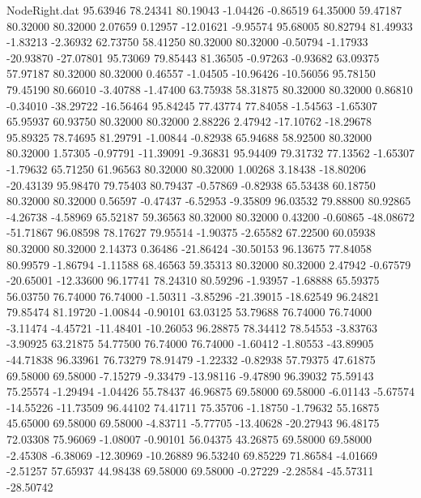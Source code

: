 \begin{filecontents}{NodeRight.dat}
  95.63946   78.24341   80.19043    -1.04426   -0.86519   64.35000   59.47187   80.32000   80.32000    2.07659    0.12957  -12.01621   -9.95574
  95.68005   80.82794   81.49933    -1.83213   -2.36932   62.73750   58.41250   80.32000   80.32000   -0.50794   -1.17933  -20.93870  -27.07801
  95.73069   79.85443   81.36505    -0.97263   -0.93682   63.09375   57.97187   80.32000   80.32000    0.46557   -1.04505  -10.96426  -10.56056
  95.78150   79.45190   80.66010    -3.40788   -1.47400   63.75938   58.31875   80.32000   80.32000    0.86810   -0.34010  -38.29722  -16.56464
  95.84245   77.43774   77.84058    -1.54563   -1.65307   65.95937   60.93750   80.32000   80.32000    2.88226    2.47942  -17.10762  -18.29678
  95.89325   78.74695   81.29791    -1.00844   -0.82938   65.94688   58.92500   80.32000   80.32000    1.57305   -0.97791  -11.39091   -9.36831
  95.94409   79.31732   77.13562    -1.65307   -1.79632   65.71250   61.96563   80.32000   80.32000    1.00268    3.18438  -18.80206  -20.43139
  95.98470   79.75403   80.79437    -0.57869   -0.82938   65.53438   60.18750   80.32000   80.32000    0.56597   -0.47437   -6.52953   -9.35809
  96.03532   79.88800   80.92865    -4.26738   -4.58969   65.52187   59.36563   80.32000   80.32000    0.43200   -0.60865  -48.08672  -51.71867
  96.08598   78.17627   79.95514    -1.90375   -2.65582   67.22500   60.05938   80.32000   80.32000    2.14373    0.36486  -21.86424  -30.50153
  96.13675   77.84058   80.99579    -1.86794   -1.11588   68.46563   59.35313   80.32000   80.32000    2.47942   -0.67579  -20.65001  -12.33600
  96.17741   78.24310   80.59296    -1.93957   -1.68888   65.59375   56.03750   76.74000   76.74000   -1.50311   -3.85296  -21.39015  -18.62549
  96.24821   79.85474   81.19720    -1.00844   -0.90101   63.03125   53.79688   76.74000   76.74000   -3.11474   -4.45721  -11.48401  -10.26053
  96.28875   78.34412   78.54553    -3.83763   -3.90925   63.21875   54.77500   76.74000   76.74000   -1.60412   -1.80553  -43.89905  -44.71838
  96.33961   76.73279   78.91479    -1.22332   -0.82938   57.79375   47.61875   69.58000   69.58000   -7.15279   -9.33479  -13.98116   -9.47890
  96.39032   75.59143   75.25574    -1.29494   -1.04426   55.78437   46.96875   69.58000   69.58000   -6.01143   -5.67574  -14.55226  -11.73509
  96.44102   74.41711   75.35706    -1.18750   -1.79632   55.16875   45.65000   69.58000   69.58000   -4.83711   -5.77705  -13.40628  -20.27943
  96.48175   72.03308   75.96069    -1.08007   -0.90101   56.04375   43.26875   69.58000   69.58000   -2.45308   -6.38069  -12.30969  -10.26889
  96.53240   69.85229   71.86584    -4.01669   -2.51257   57.65937   44.98438   69.58000   69.58000   -0.27229   -2.28584  -45.57311  -28.50742

\end{filecontents}
